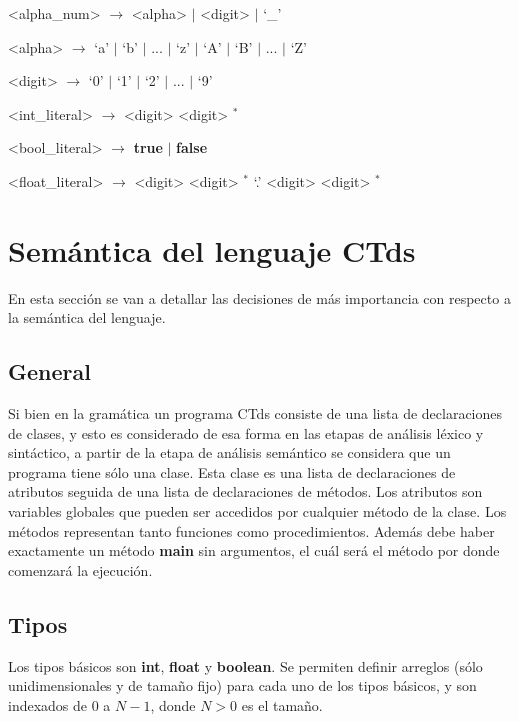 \documentclass[11pt,a4paper]{article}
\begin{document}
\begin{grammar}
<alpha_num> $\rightarrow$ <alpha> $\mid$ <digit> $\mid$ `_'

<alpha> $\rightarrow$ `a' $\mid$ `b' $\mid$ ... $\mid$ `z' $\mid$ `A' $\mid$ `B' $\mid$ ... $\mid$ `Z'

<digit> $\rightarrow$ `0' $\mid$ `1' $\mid$ `2' $\mid$ ... $\mid$ `9'

<int_literal> $\rightarrow$ <digit> <digit> $^{*}$

<bool_literal> $\rightarrow$ \textbf{true} $\mid$ \textbf{false}

<float_literal> $\rightarrow$ <digit> <digit> $^{*}$ `.' <digit> <digit> $^{*}$

\end{grammar}

\section{Semántica del lenguaje CTds}
\label{sec:semanticactds}

En esta sección se van a detallar las decisiones de más importancia con respecto a la semántica del lenguaje.

\subsection{General}
\label{subsec:general}

Si bien en la gramática un programa CTds consiste de una lista de declaraciones de clases, y esto es considerado de esa forma en las etapas de análisis léxico y sintáctico, a partir de la etapa de análisis semántico se considera que un programa tiene sólo una clase. Esta clase es una lista de declaraciones de atributos seguida de una lista de declaraciones de métodos. Los atributos son variables globales que pueden ser accedidos por cualquier método de la clase. Los métodos representan tanto funciones como procedimientos. Además debe haber exactamente un método \textbf{main} sin argumentos, el cuál será el método por donde comenzará la ejecución.

\subsection{Tipos}

Los tipos básicos son \textbf{int}, \textbf{float} y \textbf{boolean}. Se permiten definir arreglos (sólo unidimensionales y de tamaño fijo) para cada uno de los tipos básicos, y son indexados de $0$ a $N-1$, donde $N>0$ es el tamaño. 
\end{document}
